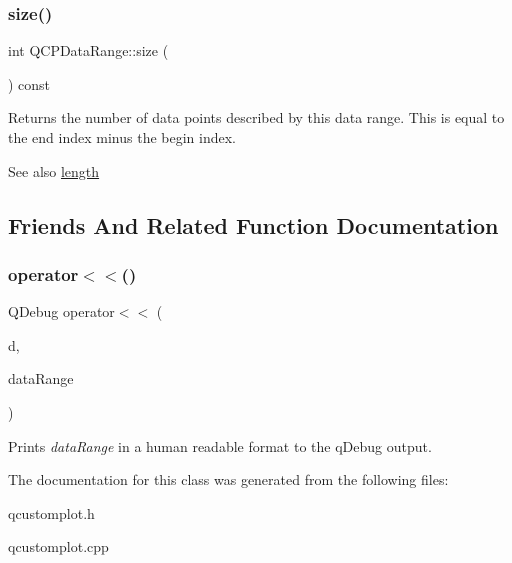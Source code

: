 \subsubsection{\texorpdfstring{size()}{size()}}
{\footnotesize\ttfamily int Q\+C\+P\+Data\+Range\+::size (\begin{DoxyParamCaption}{ }\end{DoxyParamCaption}) const\hspace{0.3cm}{\ttfamily [inline]}}

Returns the number of data points described by this data range. This is equal to the end index minus the begin index.

\begin{DoxySeeAlso}{See also}
\hyperlink{classQCPDataRange_a1e7836058f755c6ab9f11996477b7150}{length} 
\end{DoxySeeAlso}


\subsection{Friends And Related Function Documentation}
\mbox{\label{classQCPDataRange_a486dd7af8a090ed069672e3510e6a082}} 
\subsubsection{\texorpdfstring{operator$<$$<$()}{operator<<()}}
{\footnotesize\ttfamily Q\+Debug operator$<$$<$ (\begin{DoxyParamCaption}\item[{Q\+Debug}]{d,  }\item[{const \hyperlink{classQCPDataRange}{Q\+C\+P\+Data\+Range} \&}]{data\+Range }\end{DoxyParamCaption})\hspace{0.3cm}{\ttfamily [related]}}

Prints {\itshape data\+Range} in a human readable format to the q\+Debug output. 

The documentation for this class was generated from the following files\+:\begin{DoxyCompactItemize}
\item 
qcustomplot.\+h\item 
qcustomplot.\+cpp\end{DoxyCompactItemize}
